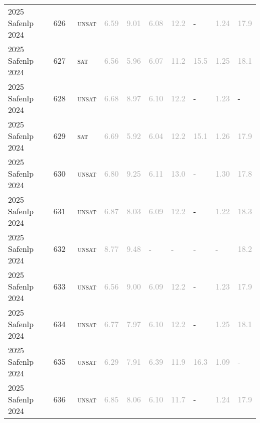 \begin{center}
{\begin{longtable}{@{}llllllllll@{}}
2025 Safenlp 2024 & 626 & ~\textsc{unsat} & \textcolor{darkgray}{6.59} & \textcolor{darkgray}{9.01} & \textcolor{darkgray}{6.08} & \textcolor{darkgray}{12.2} & - & \textcolor{darkgray}{1.24} & \textcolor{darkgray}{17.9} \\
2025 Safenlp 2024 & 627 & ~\textsc{sat} & \textcolor{darkgray}{6.56} & \textcolor{darkgray}{5.96} & \textcolor{darkgray}{6.07} & \textcolor{darkgray}{11.2} & \textcolor{darkgray}{15.5} & \textcolor{darkgray}{1.25} & \textcolor{darkgray}{18.1} \\
2025 Safenlp 2024 & 628 & ~\textsc{unsat} & \textcolor{darkgray}{6.68} & \textcolor{darkgray}{8.97} & \textcolor{darkgray}{6.10} & \textcolor{darkgray}{12.2} & - & \textcolor{darkgray}{1.23} & - \\
2025 Safenlp 2024 & 629 & ~\textsc{sat} & \textcolor{darkgray}{6.69} & \textcolor{darkgray}{5.92} & \textcolor{darkgray}{6.04} & \textcolor{darkgray}{12.2} & \textcolor{darkgray}{15.1} & \textcolor{darkgray}{1.26} & \textcolor{darkgray}{17.9} \\
2025 Safenlp 2024 & 630 & ~\textsc{unsat} & \textcolor{darkgray}{6.80} & \textcolor{darkgray}{9.25} & \textcolor{darkgray}{6.11} & \textcolor{darkgray}{13.0} & - & \textcolor{darkgray}{1.30} & \textcolor{darkgray}{17.8} \\
2025 Safenlp 2024 & 631 & ~\textsc{unsat} & \textcolor{darkgray}{6.87} & \textcolor{darkgray}{8.03} & \textcolor{darkgray}{6.09} & \textcolor{darkgray}{12.2} & - & \textcolor{darkgray}{1.22} & \textcolor{darkgray}{18.3} \\
2025 Safenlp 2024 & 632 & ~\textsc{unsat} & \textcolor{darkgray}{8.77} & \textcolor{darkgray}{9.48} & - & - & - & - & \textcolor{darkgray}{18.2} \\
2025 Safenlp 2024 & 633 & ~\textsc{unsat} & \textcolor{darkgray}{6.56} & \textcolor{darkgray}{9.00} & \textcolor{darkgray}{6.09} & \textcolor{darkgray}{12.2} & - & \textcolor{darkgray}{1.23} & \textcolor{darkgray}{17.9} \\
2025 Safenlp 2024 & 634 & ~\textsc{unsat} & \textcolor{darkgray}{6.77} & \textcolor{darkgray}{7.97} & \textcolor{darkgray}{6.10} & \textcolor{darkgray}{12.2} & - & \textcolor{darkgray}{1.25} & \textcolor{darkgray}{18.1} \\
2025 Safenlp 2024 & 635 & ~\textsc{unsat} & \textcolor{darkgray}{6.29} & \textcolor{darkgray}{7.91} & \textcolor{darkgray}{6.39} & \textcolor{darkgray}{11.9} & \textcolor{darkgray}{16.3} & \textcolor{darkgray}{1.09} & - \\
2025 Safenlp 2024 & 636 & ~\textsc{unsat} & \textcolor{darkgray}{6.85} & \textcolor{darkgray}{8.06} & \textcolor{darkgray}{6.10} & \textcolor{darkgray}{11.7} & - & \textcolor{darkgray}{1.24} & \textcolor{darkgray}{17.9} \\

\end{longtable}}
\end{center}
